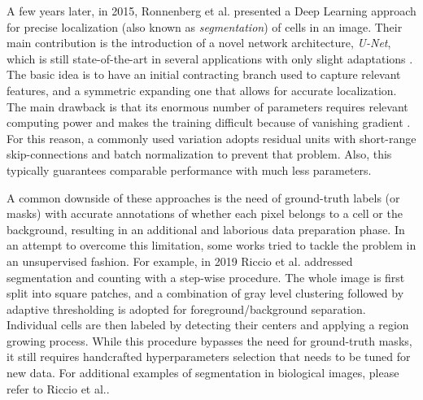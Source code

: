 A few years later, in 2015, Ronnenberg et al. \cite{unet} presented a Deep Learning approach for precise localization (also known as \textit{segmentation}) of cells in an image. Their main contribution is the introduction of a novel network architecture, \textit{U-Net}, which is still state-of-the-art in several applications with only slight adaptations \cite{masin2021novel, ritch2020axonet}. The basic idea is to have an initial contracting branch used to capture relevant features, and a symmetric expanding one that allows for accurate localization.
The main drawback is that its enormous number of parameters requires relevant computing power and makes the training difficult because of vanishing gradient \cite{vanishing_gradient}. For this reason, a commonly used variation adopts residual units \cite{residual_units} with short-range skip-connections and batch normalization to prevent that problem.
Also, this typically guarantees comparable performance with much less parameters.

A common downside of these approaches is  the need of ground-truth labels (or masks) with accurate annotations of whether each pixel belongs to a cell or the background, resulting in an additional and laborious data preparation phase.
In an attempt to overcome this limitation, some works tried to tackle the problem in an unsupervised fashion. For example, in 2019 Riccio et al. \cite{Riccio2019} addressed segmentation and counting with a step-wise procedure. The whole image is first split into square patches, and a combination of gray level clustering followed by adaptive thresholding is adopted for foreground/background separation. Individual cells are then labeled by detecting their centers and applying a region growing process. 
While this procedure bypasses the need for ground-truth masks, it still requires handcrafted hyperparameters selection that needs to be tuned for new data.
For additional examples of segmentation in biological images, please refer to Riccio et al.\cite{Riccio2019}.

